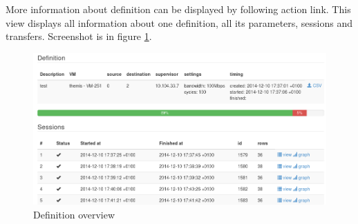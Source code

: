 More information about definition can be displayed by following  action link. This view displays all information about one definition, all its parameters, sessions and transfers. Screenshot is in figure \ref{img:themis-definition}.

\begin{figure}[htb]
	\begin{center}
	\includegraphics[width=\textwidth]{themis-definition.png}
	\end{center}
	\caption{Definition overview}
	\label{img:themis-definition}
\end{figure}



